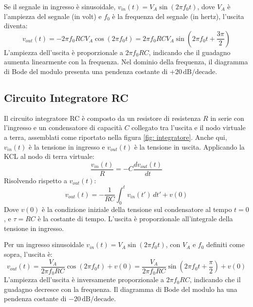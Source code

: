\documentclass[a4paper,12pt]{article}
\begin{document}
Se il segnale in ingresso è sinusoidale, \( v_{in}(t) = V_A \sin(2\pi f_0 t) \), dove \( V_A \) è l’ampiezza del segnale (in volt) e \( f_0 \) è la frequenza del segnale (in hertz), l’uscita diventa:
\begin{equation}
    \label{sin_derivatore}
    v_{out}(t) = -2\pi f_0 RC V_A \cos(2\pi f_0 t) = 2\pi f_0 RC V_A \sin\left(2\pi f_0 t + \frac{3\pi}{2}\right)
\end{equation}
L’ampiezza dell’uscita è proporzionale a \( 2\pi f_0 RC \), indicando che il guadagno aumenta linearmente con la frequenza. Nel dominio della frequenza, il diagramma di Bode del modulo presenta una pendenza costante di \( +20 \, \text{dB/decade} \).

\subsection{Circuito Integratore RC}
Il circuito integratore RC è composto da un resistore di resistenza \( R \) in serie con l’ingresso e un condensatore di capacità \( C \) collegato tra l’uscita e il nodo virtuale a terra, assemblati come riportato nella figura \ref{fig: integratore}. Anche qui, \( v_{in}(t) \) è la tensione in ingresso e \( v_{out}(t) \) è la tensione in uscita. Applicando la KCL al nodo di terra virtuale:
\begin{equation}
    \frac{v_{in}(t)}{R} = -C \frac{d v_{out}(t)}{dt}
\end{equation}
Risolvendo rispetto a \( v_{out}(t) \):
\begin{equation}
    v_{out}(t) = -\frac{1}{RC} \int_0^t v_{in}(t') \, dt' + v(0)
\end{equation}
Dove \( v(0) \) è la condizione iniziale della tensione sul condensatore al tempo \( t = 0 \), e \( \tau = RC \) è la costante di tempo. L’uscita è proporzionale all’integrale della tensione in ingresso.

Per un ingresso sinusoidale \( v_{in}(t) = V_A \sin(2\pi f_0 t) \), con \( V_A \) e \( f_0 \) definiti come sopra, l’uscita è:
\begin{equation}
    \label{eq: integratore_sin}
    v_{out}(t) = \frac{V_A}{2\pi f_0 RC} \cos(2\pi f_0 t) + v(0) = \frac{V_A}{2\pi f_0 RC} \sin\left(2\pi f_0 t + \frac{\pi}{2}\right) + v(0)
\end{equation}
L’ampiezza dell’uscita è inversamente proporzionale a \( 2\pi f_0 RC \), indicando che il guadagno decresce con la frequenza. Il diagramma di Bode del modulo ha una pendenza costante di \( -20 \, \text{dB/decade} \).
\end{document}
